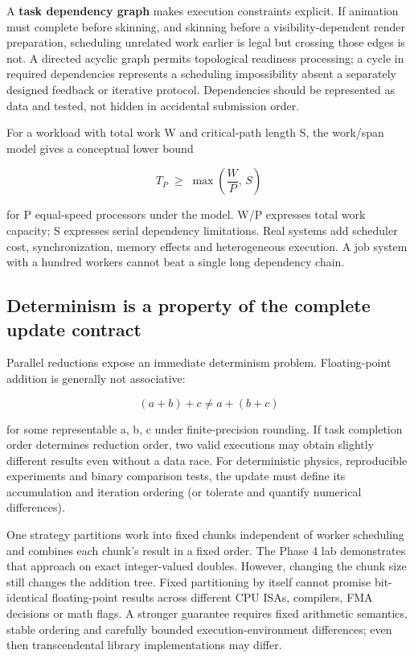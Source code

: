 A \textbf{task dependency graph} makes execution constraints explicit. If animation must complete before skinning, and skinning before a visibility-dependent render preparation, scheduling unrelated work earlier is legal but crossing those edges is not. A directed acyclic graph permits topological readiness processing; a cycle in required dependencies represents a scheduling impossibility absent a separately designed feedback or iterative protocol. Dependencies should be represented as data and tested, not hidden in accidental submission order.

For a workload with total work W and critical-path length S, the work/span model gives a conceptual lower bound

\[
T_P\;\geq\;\max\!\left(\frac{W}{P},\, S\right)
\]

for P equal-speed processors under the model. W/P expresses total work capacity; S expresses serial dependency limitations. Real systems add scheduler cost, synchronization, memory effects and heterogeneous execution. A job system with a hundred workers cannot beat a single long dependency chain.

\subsection{Determinism is a property of the complete update contract}\label{01-foundations-i-ch007-determinism-is-a-property-of-the-complete-update-contract}

Parallel reductions expose an immediate determinism problem. Floating-point addition is generally not associative:

\[
(a+b)+c\neq a+(b+c)
\]

for some representable a, b, c under finite-precision rounding. If task completion order determines reduction order, two valid executions may obtain slightly different results even without a data race. For deterministic physics, reproducible experiments and binary comparison tests, the update must define its accumulation and iteration ordering (or tolerate and quantify numerical differences).

One strategy partitions work into fixed chunks independent of worker scheduling and combines each chunk's result in a fixed order. The Phase 4 lab demonstrates that approach on exact integer-valued doubles. However, changing the chunk size still changes the addition tree. Fixed partitioning by itself cannot promise bit-identical floating-point results across different CPU ISAs, compilers, FMA decisions or math flags. A stronger guarantee requires fixed arithmetic semantics, stable ordering and carefully bounded execution-environment differences; even then transcendental library implementations may differ.

